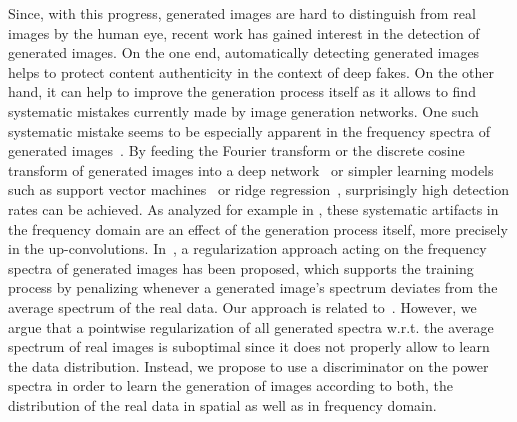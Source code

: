 \documentclass[letterpaper]{article} %
\begin{document}
Since, with this progress, generated images are hard to distinguish from real images by the human eye, recent work has gained interest in the detection of generated images. On the one end, automatically detecting generated images helps to protect content authenticity in the context of deep fakes. On the other hand, it can help to improve the generation process itself as it allows to find systematic mistakes currently made by image generation networks. One such systematic mistake seems to be especially apparent in the frequency spectra of generated images~\cite{durall2019unmasking,Wang_2020_CVPR,frank2020leveraging,bai2020fake}. By feeding the Fourier transform or the discrete cosine transform of generated images into a deep network~\cite{Wang_2020_CVPR} or simpler learning models such as support vector machines~\cite{durall2019unmasking} or ridge regression~\cite{frank2020leveraging}, surprisingly high detection rates can be achieved. As analyzed for example in \cite{durall2019unmasking,frank2020leveraging}, these systematic artifacts in the frequency domain are an effect of the generation process itself, more precisely in the up-convolutions.
%
%
%
%
In~\cite{margret2020upconvolution}, a regularization approach acting on the frequency spectra of generated images has been proposed, which supports the training process by penalizing whenever a generated image's spectrum deviates from the average spectrum of the real data.
Our approach is related to~\cite{margret2020upconvolution}. However, we argue that a pointwise regularization of all generated spectra w.r.t. the average spectrum of real images is suboptimal since it does not properly allow to learn the data distribution. Instead, we propose to use a discriminator on the power spectra in order to learn the generation of images according to both, the distribution of the real data in spatial as well as in frequency domain.
\end{document}
